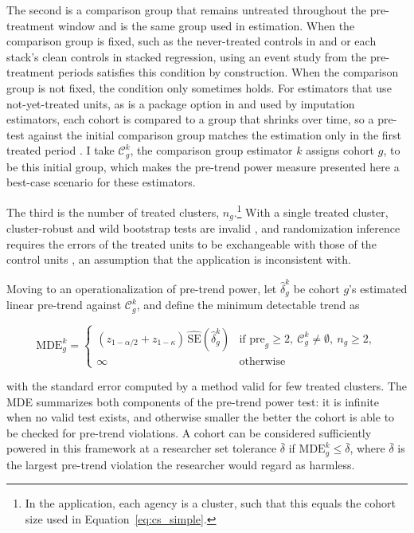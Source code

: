 \documentclass[12pt]{article}
\begin{document}
The second is a comparison group that remains untreated throughout the pre-treatment window and is the same group used in estimation. When the comparison group is fixed, such as the never-treated controls in \textcite{callaway2021difference} and \textcite{sun2021estimating} or each stack's clean controls in stacked regression, using an event study from the pre-treatment periods satisfies this condition by construction. When the comparison group is not fixed, the condition only sometimes holds. For estimators that use not-yet-treated units, as is a package option in \textcite{callaway2021difference} and used by imputation estimators, each cohort is compared to a group that shrinks over time, so a pre-test against the initial comparison group matches the estimation only in the first treated period \parencite{liu2025cohort}. I take $\mathcal{C}^k_g$, the comparison group estimator $k$ assigns cohort $g$, to be this initial group, which makes the pre-trend power measure presented here a best-case scenario for these estimators.  

The third is the number of treated clusters, $n_g$.\footnote{In the application, each agency is a cluster, such that this equals the cohort size used in Equation~\ref{eq:cs_simple}.} With a single treated cluster, cluster-robust and wild bootstrap tests are invalid \parencite{mackinnon2018wild}, and randomization inference requires the errors of the treated units to be exchangeable with those of the control units \parencite{conley2011inference}, an assumption that the application is inconsistent with.

Moving to an operationalization of pre-trend power, let $\hat{\delta}^k_g$ be cohort $g$'s estimated linear pre-trend against $\mathcal{C}^k_g$, and define the minimum detectable trend as

\begin{equation}\label{eq:mde}
    \text{MDE}^k_g = \begin{cases}
        (z_{1-\alpha/2}+z_{1-\kappa})\, \widehat{\text{SE}}(\hat{\delta}^k_g) & \text{if } \text{pre}_g \geq 2, \ \mathcal{C}^k_g \neq \emptyset,\ n_g \geq 2, \\
        \infty & \text{otherwise}
    \end{cases}
\end{equation}

with the standard error computed by a method valid for few treated clusters. The MDE summarizes both components of the pre-trend power test: it is infinite when no valid test exists, and otherwise smaller the better the cohort is able to be checked for pre-trend violations. A cohort can be considered sufficiently powered in this framework at a researcher set tolerance $\bar{\delta}$ if $\text{MDE}_g^k \leq \bar{\delta}$, where $\bar{\delta}$ is the largest pre-trend violation the researcher would regard as harmless. 
\end{document}
